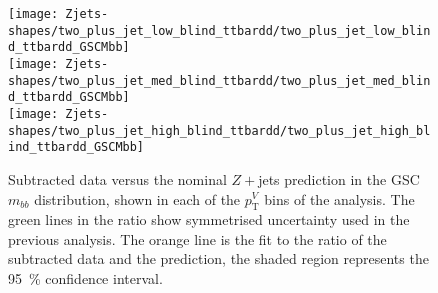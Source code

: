 \begin{figure}[ht]
  \centering
  \texttt{[image: Zjets-shapes/two\_plus\_jet\_low\_blind\_ttbardd/two\_plus\_jet\_low\_blind\_ttbardd\_GSCMbb]}
  \\
  \vspace{-8mm}
  \texttt{[image: Zjets-shapes/two\_plus\_jet\_med\_blind\_ttbardd/two\_plus\_jet\_med\_blind\_ttbardd\_GSCMbb]}
  \\
  \vspace{-8mm}
  \texttt{[image: Zjets-shapes/two\_plus\_jet\_high\_blind\_ttbardd/two\_plus\_jet\_high\_blind\_ttbardd\_GSCMbb]}
  \caption[Subtracted data versus the nominal $Z+$jets prediction, GSC
  $m_{bb}$ across different analysis $p_{\mathrm{T}}^V$ bins.]{
    \footnotesize Subtracted data versus the nominal $Z+$jets prediction in the
    GSC $m_{bb}$ distribution, shown in each of the $p_{\mathrm{T}}^V$ bins of
    the analysis. The green lines in the ratio show symmetrised uncertainty used
    in the previous analysis. The orange line is the fit to the ratio of the
    subtracted data and the prediction, the shaded region represents the 95~\%
    confidence interval.}
  \label{fig:zjets-mbb-shape-ptv-range}
\end{figure}